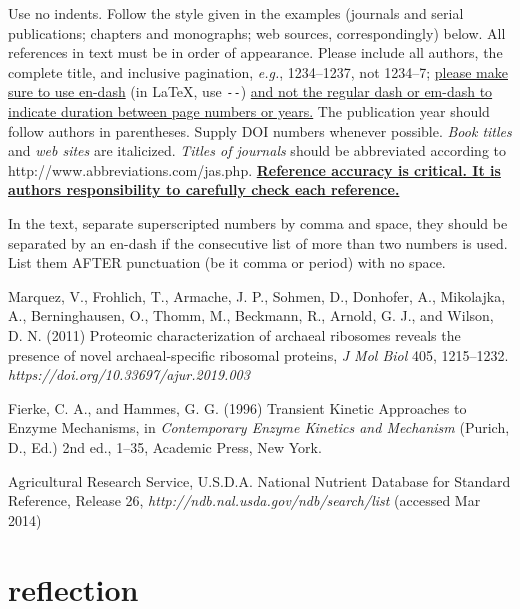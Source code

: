 \documentclass[10pt]{article}
\begin{document}
Use no indents. Follow the style given in the examples (journals and serial publications;\cite{journal} chapters and monographs;\cite{chapters} web sources,\cite{web} correspondingly) below. All references in text must be in order of appearance. Please include all authors, the complete title, and inclusive pagination, \textit{e.g.}, 1234--1237, not 1234--7; \ul{please make sure to use en-dash} (in \LaTeX, use \verb+--+) \ul{and not the regular dash or em-dash to indicate duration between page numbers or years.} The publication year should follow authors in parentheses. Supply DOI numbers whenever possible. \textit{Book titles} and \textit{web sites} are italicized. \textit{Titles of journals} should be abbreviated according to http://www.abbreviations.com/jas.php. \textbf{\ul{Reference accuracy is critical. It is authors responsibility to carefully check each reference.}} 

In the text, separate superscripted numbers by comma and space,\cite{journal,chapters} they should be separated by an en-dash if the consecutive list of more than two numbers is used.\cite{journal,chapters,web} List them AFTER punctuation (be it comma or period) with no space.

\begin{thebibliography}{9} %

 Marquez, V., Frohlich, T., Armache, J. P., Sohmen, D., Donhofer, A., Mikolajka, A., Berninghausen, O., Thomm, M., Beckmann, R., Arnold, G. J., and Wilson, D. N. (2011) Proteomic characterization of archaeal ribosomes reveals the presence of novel archaeal-specific ribosomal proteins, \textit{J Mol Biol} 405, 1215--1232. \textit {https://doi.org/10.33697/ajur.2019.003}


 Fierke, C. A., and Hammes, G. G. (1996) Transient Kinetic Approaches to Enzyme Mechanisms, in \textit{Contemporary Enzyme Kinetics and Mechanism} (Purich, D., Ed.) 2nd ed., 1--35, Academic Press, New York.

 Agricultural Research Service, U.S.D.A. National Nutrient Database for Standard Reference, Release 26, \textit{http://ndb.nal.usda.gov/ndb/search/list} (accessed Mar 2014)
\end{thebibliography}

\section*{reflection}
\end{document}
